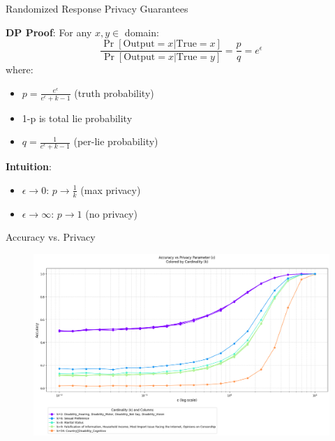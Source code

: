 \documentclass{beamer}
\begin{document}
\begin{frame}{Randomized Response Privacy Guarantees}
\footnotesize

\textbf{DP Proof}:
For any $x,y \in$ domain:
\[
\frac{\Pr[\text{Output}=x|\text{True}=x]}{\Pr[\text{Output}=x|\text{True}=y]} = \frac{p}{q} = e^\epsilon
\]
where:
\begin{itemize}
\item $p = \frac{e^\epsilon}{e^\epsilon + k - 1}$ (truth probability)
\item 1-p is total lie probability
\item $q = \frac{1}{e^\epsilon + k - 1}$ (per-lie probability)
\end{itemize}

\vspace{0.5em}
\textbf{Intuition}:
\begin{itemize}
\item $\epsilon \to 0$: $p\to\frac{1}{k}$ (max privacy)
\item $\epsilon \to \infty$: $p\to1$ (no privacy)
\end{itemize}
\end{frame}


\begin{frame}{Accuracy vs. Privacy}
\begin{figure}
    \centering
    \includegraphics[width=1.06\textwidth]{slide_image/final.png}
\end{figure}
\end{frame}
\end{document}

